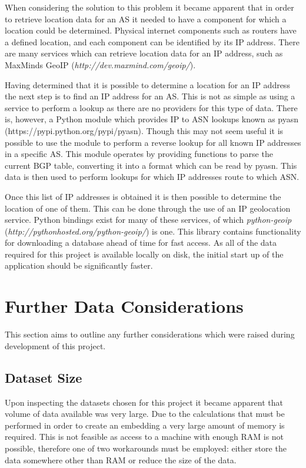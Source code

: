 When considering the solution to this problem it became apparent that in order to retrieve location data for an AS it needed to have a component for which a location could be determined. Physical internet components such as routers have a defined location, and each component can be identified by its IP address. There are many services which can retrieve location data for an IP address, such as MaxMinds GeoIP (\textit{http://dev.maxmind.com/geoip/}). 

Having determined that it is possible to determine a location for an IP address the next step is to find an IP address for an AS. This is not as simple as using a service to perform a lookup as there are no providers for this type of data. There is, however, a Python module which provides IP to ASN lookups known as pyasn (https://pypi.python.org/pypi/pyasn). Though this may not seem useful it is possible to use the module to perform a reverse lookup for all known IP addresses in a specific AS. This module operates by providing functions to parse the current BGP table, converting it into a format which can be read by pyasn. This data is then used to perform lookups for which IP addresses route to which ASN.

Once this list of IP addresses is obtained it is then possible to determine the location of one of them. This can be done through the use of an IP geolocation service. Python bindings exist for many of these services, of which \textit{python-geoip} (\textit{http://pythonhosted.org/python-geoip/}) is one. This library contains functionality for downloading a database ahead of time for fast access. As all of the data required for this project is available locally on disk, the initial start up of the application should be significantly faster. 

\section{Further Data Considerations}

This section aims to outline any further considerations which were raised during development of this project.

\subsection{Dataset Size}

Upon inspecting the datasets chosen for this project it became apparent that volume of data available was very large. Due to the calculations that must be performed in order to create an embedding a very large amount of memory is required. This is not feasible as access to a machine with enough RAM is not possible, therefore one of two workarounds must be employed: either store the data somewhere other than RAM or reduce the size of the data. 


